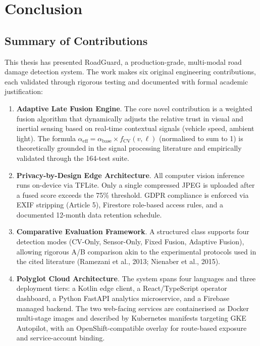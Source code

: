 \chapter{Conclusion}
\label{ch:conclusion}

\section{Summary of Contributions}

This thesis has presented RoadGuard, a production-grade, multi-modal road
damage detection system. The work makes six original engineering contributions,
each validated through rigorous testing and documented with formal academic
justification:

\begin{enumerate}

    \item \textbf{Adaptive Late Fusion Engine}. The core novel contribution
    is a weighted fusion algorithm that dynamically adjusts the relative trust
    in visual and inertial sensing based on real-time contextual signals
    (vehicle speed, ambient light). The formula
    $\alpha_{\text{eff}} = \alpha_{\text{base}} \times f_{\text{CV}}(v, \ell)$
    (normalised to sum to 1) is theoretically grounded in the signal processing
    literature and empirically validated through the 164-test suite.

    \item \textbf{Privacy-by-Design Edge Architecture}. All computer vision
    inference runs on-device via TFLite. Only a single compressed JPEG is
    uploaded after a fused score exceeds the 75\% threshold. GDPR compliance
    is enforced via EXIF stripping (Article 5), Firestore role-based access
    rules, and a documented 12-month data retention schedule.

    \item \textbf{Comparative Evaluation Framework}. A structured
     class supports four detection modes
    (CV-Only, Sensor-Only, Fixed Fusion, Adaptive Fusion), allowing
    rigorous A/B comparison akin to the experimental protocols used in
    the cited literature (Ramezani et al., 2013; Nienaber et al., 2015).

    \item \textbf{Polyglot Cloud Architecture}. The system spans four languages
    and three deployment tiers: a Kotlin edge client, a React/TypeScript
    operator dashboard, a Python FastAPI analytics microservice, and a
    Firebase managed backend. The two web-facing services are containerised
    as Docker multi-stage images and described by Kubernetes manifests
    targeting GKE Autopilot, with an OpenShift-compatible overlay for
    route-based exposure and service-account binding.


\end{enumerate}
